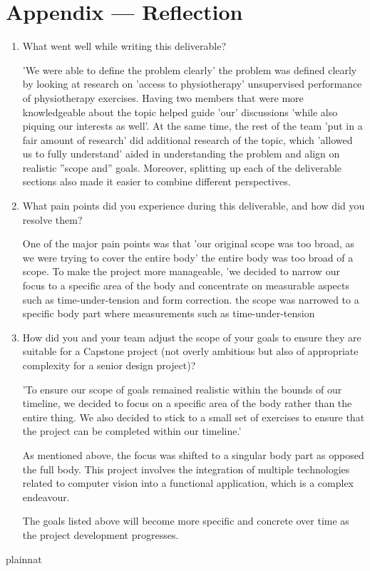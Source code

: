 \documentclass{article}
\begin{document}
\section*{Appendix --- Reflection}





\begin{enumerate}
    \item What went well while writing this deliverable? 

    'We were able to define the problem clearly' the problem was defined clearly by looking at research on 'access to physiotherapy' unsupervised performance of physiotherapy exercises. Having 
    two members that were more knowledgeable 
    about the topic helped guide 'our' discussions 'while also piquing our interests as well'. At the same time, the 
    rest of the team 'put in a fair amount of research' did additional research of the topic, which 'allowed us to fully understand' aided in understanding the problem and align 
    on realistic ''scope and'' goals. Moreover, splitting up each of the deliverable sections also made it easier to combine 
    different perspectives.

    \item What pain points did you experience during this deliverable, and how
    did you resolve them?

    One of the major pain points was that 'our original scope was too broad, as we were trying to cover the entire body' the entire body was too broad of a scope. To 
    make the project more manageable, 'we decided to narrow our focus to a specific area of the body and concentrate on
    measurable aspects such as time-under-tension and form correction.  the scope was narrowed to a specific body part where measurements such as time-under-tension

    \item How did you and your team adjust the scope of your goals to ensure
    they are suitable for a Capstone project (not overly ambitious but also of
    appropriate complexity for a senior design project)?

    'To ensure our scope of goals remained realistic within the bounds of our timeline, we decided to focus on a specific area 
    of the body rather than the entire thing. We also decided to stick to a small set of exercises to ensure that the project
    can be completed within our timeline.'
    
    As mentioned above, the focus was shifted to a singular body part as opposed the full body. This project involves the integration 
    of multiple technologies related to computer vision into a functional application, which is a complex endeavour. 
    
    The goals listed above will become more specific and concrete over time as the project development progresses. 
\end{enumerate}  

 {plainnat}

\end{document}
